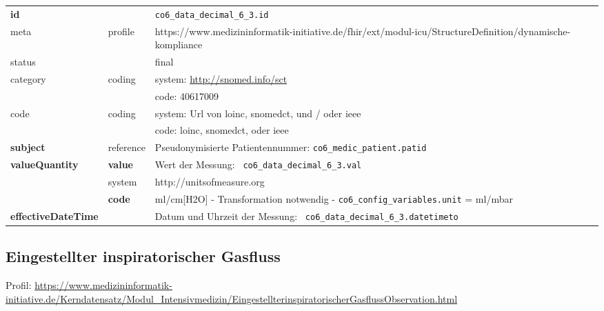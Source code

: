 \begin{longtable}{|l|l|p{7.5cm}|}
	\hline
	\rowcolor{lightgray} \multicolumn{3}{|l|}{Data Mapping (inhaltlich)} \\ \hline
	\textbf{id} &  & \texttt{co6\_data\_decimal\_6\_3.id} \\ \hline
	meta & profile & https://www.medizininformatik-initiative.de/fhir/ext/modul-icu/StructureDefinition/dynamische-kompliance \\ \hline 
	status &  & final   \\ \hline 
	category & coding & system: \url{http://snomed.info/sct} \\
	\cline{3-3}
	& & code: 40617009 \\ \hline
	code & coding & system: Url von \ac{loinc}, \ac{snomedct}, und / oder \ac{ieee} \\ 
	\cline{3-3} 
	&  & code: \ac{loinc}, \ac{snomedct}, oder \ac{ieee} \\ \hline
	\textbf{subject}  & reference & Pseudonymisierte Patientennummer: \texttt{co6\_medic\_patient.patid} \\ \hline
	\textbf{valueQuantity}  & \textbf{value} & Wert der Messung: \texttt{
		co6\_data\_decimal\_6\_3.val} \\
	\cline{2-3}
	& system & http://unitsofmeasure.org \\
	\cline{2-3}
	& \textbf{code} &
	ml/cm[H2O] - Transformation notwendig - \texttt{co6\_config\_variables.unit} = ml/mbar
	\\ \hline
	\textbf{effectiveDateTime}  & & Datum und Uhrzeit der Messung: \texttt{
		co6\_data\_decimal\_6\_3.datetimeto} \\ \hline
\end{longtable}

\subsection{Eingestellter inspiratorischer Gasfluss} 

Profil: \url{https://www.medizininformatik-initiative.de/Kerndatensatz/Modul_Intensivmedizin/EingestellterinspiratorischerGasflussObservation.html}

